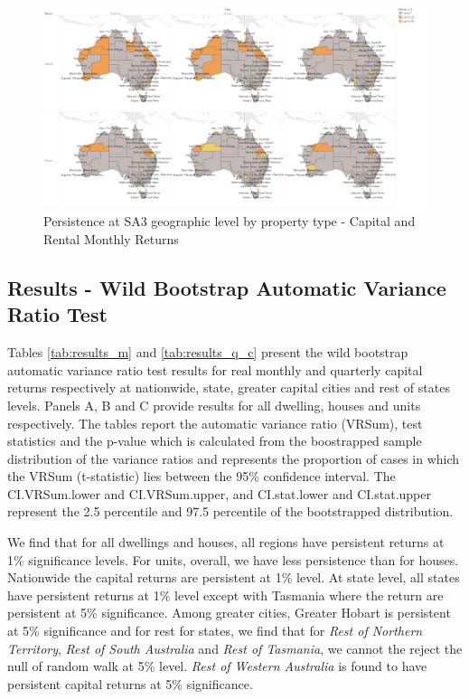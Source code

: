 \documentclass[AEJ,reqno, draftmode]{AEA}
\begin{document}
\begin{figure}
    \centering
     \includegraphics[width=\columnwidth]{Figures/maps_quarterly_all.png}
 \caption{Persistence at SA3 geographic level by property type - Capital and Rental Monthly Returns}
 \label{fig:maps_quarterly_all}
\end{figure}



\subsection{Results - Wild Bootstrap Automatic Variance Ratio Test}


Tables \ref{tab:results_m} and \ref{tab:results_q_c} present the wild bootstrap automatic variance ratio test results for real monthly and quarterly capital returns respectively at nationwide, state, greater capital cities and rest of states levels. Panels A, B and C provide results for all dwelling, houses and units respectively. The tables report the automatic variance ratio (VRSum), test statistics and the p-value which is calculated from the boostrapped sample distribution of the variance ratios and represents the proportion of cases in which the VRSum (t-statistic) lies between the 95\% confidence interval. The CI.VRSum.lower and CI.VRSum.upper, and CI.stat.lower and CI.stat.upper represent the 2.5 percentile and 97.5 percentile of the bootstrapped distribution.

We find that for all dwellings and houses, all regions have persistent returns at 1\% significance levels. For units, overall, we have less persistence than for houses. Nationwide the capital returns are persistent at 1\% level. At state level, all states have persistent returns at 1\% level except with Tasmania where the return are persistent at 5\% significance. Among greater cities, Greater Hobart is persistent at 5\% significance and for rest for states, we find that for \textit{Rest of Northern Territory}, \textit{Rest of South Australia} and \textit{Rest of Tasmania}, we cannot the reject the null of random walk at 5\% level. \textit{Rest of Western Australia} is found to have persistent capital returns at 5\% significance. 
\end{document}

